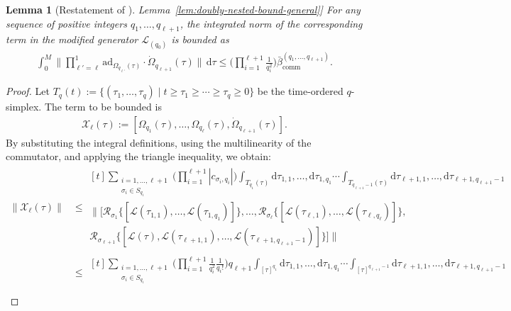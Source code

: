 \documentclass[11pt]{article}
\newtheorem{lemma}{Lemma}
\newcommand{\lem}[1]{\hyperref[lem:#1]{Lemma~\ref*{lem:#1}}}
\renewcommand{\d}{\mathrm{d}}
\newcommand{\ad}{\mathrm{ad}}
\renewcommand{\comm}{\mathrm{comm}}
\newcommand{\mc}{\mathcal}
\begin{document}
\begin{lemma}[Restatement of \lem{doubly-nested-bound-general}] 
For any sequence of positive integers $q_1, \ldots, q_{\ell+1}$, the integrated norm of the corresponding term in the modified generator $\mc L_{(q_0)}$ is bounded as
 \begin{align*}
  \int_{0}^{M} \bigg\|\prod_{\ell'=\ell}^1 \ad_{\Omega_{q_{\ell'}}(\tau)}\cdot\dot\Omega_{q_{\ell+1}}(\tau)\bigg\| \,\d\tau \le \bigg(\prod_{i=1}^{\ell+1} \frac{1}{q_i^2}\bigg) \bar{\beta}_{\comm}^{(q_1, \ldots, q_{\ell+1})}.
 \end{align*}
\end{lemma}
\begin{proof}
Let $T_q(t) := \{(\tau_1, \ldots, \tau_q) \mid t \ge \tau_1 \ge \cdots \ge \tau_q \ge 0\}$ be the time-ordered $q$-simplex.
 The term to be bounded is
\begin{align*}
    \mc{X}_{\ell}(\tau) := [\Omega_{q_1}(\tau), \ldots, \Omega_{q_\ell}(\tau), \dot{\Omega}_{q_{\ell+1}}(\tau)].
\end{align*}
By substituting the integral definitions, using the multilinearity of the commutator, and applying the triangle inequality, we obtain:
\begin{align}
    \|\mc{X}_{\ell}(\tau)\| 
    &\le \begin{multlined}[t]\sum_{\substack{i = 1 , \ldots, \ell+1\\\sigma_i\in S_{q_{i}}}} \bigg(\prod_{i=1}^{\ell+1} |c_{\sigma_i, q_i}|\bigg) \int_{T_{q_1}(\tau)} \d\tau_{1,1}, \ldots,\d\tau_{1,q_1}\cdots\int_{T_{q_{\ell+1}-1}(\tau)}\d\tau_{\ell+1,1},\ldots,\d\tau_{\ell+1,q_{\ell+1}-1} \\
        \bigg\| \Big[ \mc R_{\sigma_1}\big\{[\mc L(\tau_{1,1}), \ldots, \mc L(\tau_{1,q_1})]\big\}, \ldots, \mc R_{\sigma_\ell}\big\{[\mc L(\tau_{\ell,1}), \ldots, \mc L(\tau_{\ell,q_\ell})]\big\}, \\
        \mc R_{\sigma_{\ell+1}}\big\{[\mc L(\tau), \mc L(\tau_{\ell+1,1}), \ldots, \mc L(\tau_{\ell+1,q_{\ell+1}-1})]\big\} \Big] \bigg\|\nonumber
    \end{multlined}\\
    & \le \begin{multlined}[t]\sum_{\substack{i = 1 , \ldots, \ell+1\\\sigma_i\in S_{q_{i}}}} \bigg(\prod_{i=1}^{\ell+1} \frac{1}{q_i^2} \frac{1}{q_i!}\bigg)q_{\ell+1} \int_{[\tau]^{q_1}} \d\tau_{1,1}, \ldots,\d\tau_{1,q_1}\cdots\int_{[\tau]^{q_{\ell+1}-1}}\d\tau_{\ell+1,1},\ldots,\d\tau_{\ell+1,q_{\ell+1}-1} \\

\end{multlined}
\end{align}
\end{proof}
\end{document}
